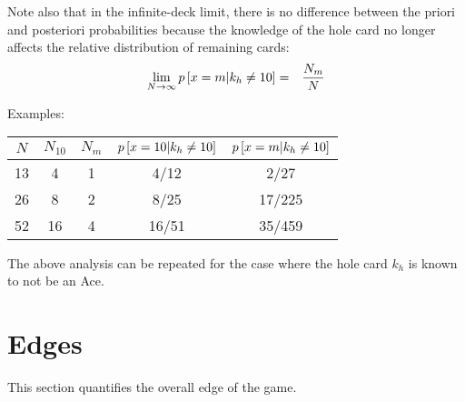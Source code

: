 Note also that in the infinite-deck limit, there is no difference
between the priori and posteriori probabilities because
the knowledge of the hole card no longer affects the relative distribution of 
remaining cards:
\begin{eqnarray}
\lim_{N\rightarrow\infty}{p\left[x=m|k_h\neq{}10\right]} &=& \frac{N_m}{N}
\end{eqnarray}

\noindent
Examples:
\begin{center}
\begin{tabular}{|c|c|c||c|c|}
\hline
$N$ & $N_10$ & $N_m$ & $p\left[x=10|k_h\neq{}10\right]$ & $p\left[x=m|k_h\neq{}10\right]$ \\ \hline \hline
13 & 4 & 1 & 4/12 & 2/27 \\ \hline
26 & 8 & 2 & 8/25 & 17/225 \\ \hline
52 & 16 & 4 & 16/51 & 35/459 \\ \hline
\end{tabular}
\end{center}

The above analysis can be repeated for the case where the hole card $k_h$
is known to not be an Ace.  

\section{Edges}
\label{sec:basic:edges}

This section quantifies the overall edge of the game.

